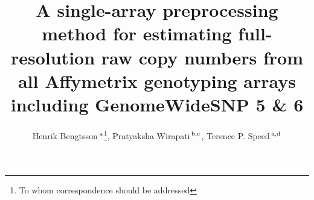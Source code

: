 \documentclass{bioinfo}
\begin{document}

\title[CRMA~v2]{A single-array preprocessing method for estimating full-resolution raw copy numbers from all Affymetrix genotyping arrays including GenomeWideSNP 5 \& 6}
\author[Bengtsson \& Speed]{Henrik Bengtsson\,$^{\rm a}$\footnote{To whom correspondence should be addressed}, Pratyaksha Wirapati\,$^{\rm b,c}$, Terence P. Speed\,$^{\rm a,d}$}
\address{
  $^{\rm a}$ Department of Statistics, University of California, Berkeley, USA.
  $^{\rm b}$ National Center of Competence in Research Molecular Oncology, Swiss Institute of Experimental Cancer Research, Epalinges, Switzerland.
  $^{\rm c}$ Swiss Institute of Bioinformatics, Lausanne, Switzerland.
  $^{\rm d}$ Bioinformatics Division, Walter \& Eliza Hall Institute of Medical Research, Parkville, Australia.
} 



\maketitle
\end{document}
